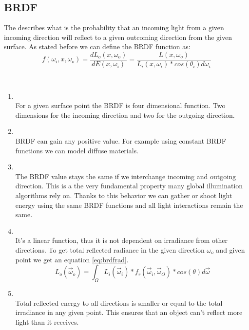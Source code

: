 
\subsection{BRDF}
The  describes what is the probability that an incoming light from a given incoming direction will reflect to a given outcoming direction from the given surface. As stated before we can define the BRDF function as:
\begin{equation}
f(\omega_{i},x,\omega_{o})=\frac{dL_{o}(x,\omega_{o})}{dE(x,\omega_{i})}=\frac{L(x,\omega_{o})}{L_{i}(x,\omega_{i})*cos(\theta_{i})d\omega_{i}}
\end{equation}

\\
 \begin{enumerate}
\item {}\\
For a given surface point  the BRDF is four dimensional function. Two dimensions for the incoming direction and two for the outgoing direction.

\item {}\\
BRDF can gain any positive value. For example using constant BRDF functions we can model diffuse materials.

\item {}\\
The BRDF value stays the same if we interchange incoming and outgoing direction. This is a the very fundamental property many global illumination algorithms rely on. Thanks to this behavior we can gather or shoot light energy using the same BRDF functions and all light interactions remain the same. 

\item {}\\
It's a linear function, thus it is not dependent on irradiance from other directions. To get total reflected radiance in the given direction $\omega_{o}$ and given point we get an equation \ref{eq:brdfrad}.
 \begin{equation}
L_{o}(\vec\omega_{o})=\int_{\Omega}L_{i}(\vec\omega_{i})*f_{r}(\vec\omega_{i},\vec\omega_{O})*cos(\theta)d\vec\omega
\label{eq:brdfrad} 
\end{equation}

\item {}\\
Total reflected energy to all directions is smaller or equal to the total irradiance in any given point. This ensures that an object can't reflect more light than it receives. 

\end{enumerate}
